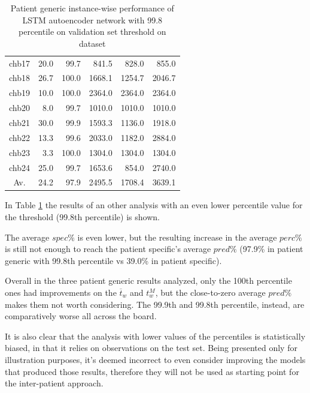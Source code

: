\begin{table}[ht]
\begin{tabular}{c|rrrrr}
    chb17   & 20.0   & 99.7   & 841.5   & 828.0   & 855.0   \\
    chb18   & 26.7   & 100.0  & 1668.1  & 1254.7  & 2046.7  \\
    chb19   & 10.0   & 100.0  & 2364.0  & 2364.0  & 2364.0  \\
    chb20   & 8.0    & 99.7   & 1010.0  & 1010.0  & 1010.0  \\
    chb21   & 30.0   & 99.9   & 1593.3  & 1136.0  & 1918.0  \\
    chb22   & 13.3   & 99.6   & 2033.0  & 1182.0  & 2884.0  \\
    chb23   & 3.3    & 100.0  & 1304.0  & 1304.0  & 1304.0  \\
    chb24   & 25.0   & 99.7   & 1653.6  & 854.0   & 2740.0  \\ \hline
    Av.     & 24.2   & 97.9   & 2495.5  & 1708.4  & 3639.1  \\ \hline
    \end{tabular}
    \caption{Patient generic instance-wise performance of LSTM autoencoder network with 99.8 percentile on validation set threshold on  dataset}
    \label{tab:patient-generic-99.8perc-lstm-instance} 
\end{table}

In Table \ref{tab:patient-generic-99.8perc-lstm-instance} the results of an other analysis with an even lower percentile value for the threshold (99.8th percentile) is shown.

The average $spec\%$ is even lower, but the resulting increase in the average $perc\%$ is still not enough to reach the patient specific's average $pred\%$ (97.9\% in patient generic with 99.8th percentile vs 39.0\% in patient specific).

Overall in the three patient generic results analyzed, only the 100th percentile ones had improvements on the $\overline{t}_w$ and $t_w^M$, but the close-to-zero average $pred\%$ makes them not worth considering. The 99.9th and 99.8th percentile, instead, are comparatively worse all across the board.

It is also clear that the analysis with lower values of the percentiles is statistically biased, in that it relies on observations on the test set. Being presented only for illustration purposes, it's deemed incorrect to even consider improving the models that produced those results, therefore they will not be used as starting point for the inter-patient approach.

